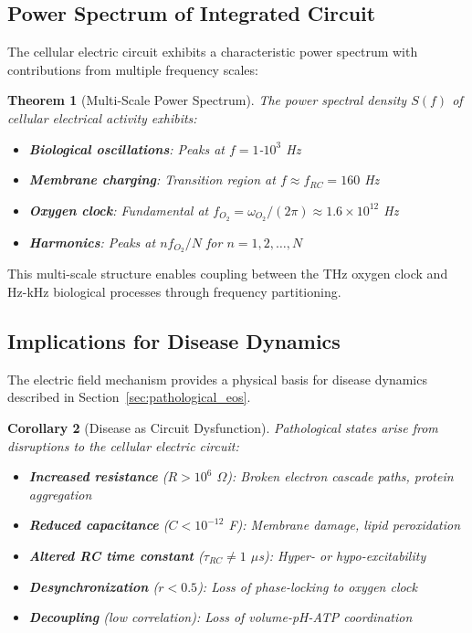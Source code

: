 \documentclass[11pt,twocolumn,a4paper]{article}
\newtheorem{theorem}{Theorem}[section]
\newtheorem{corollary}[theorem]{Corollary}
\theoremstyle{definition}
\theoremstyle{remark}
\begin{document}
\subsection{Power Spectrum of Integrated Circuit}

The cellular electric circuit exhibits a characteristic power spectrum with contributions from multiple frequency scales:

\begin{theorem}[Multi-Scale Power Spectrum]
\label{thm:power_spectrum}
The power spectral density $S(f)$ of cellular electrical activity exhibits:
\begin{itemize}
  \item \textbf{Biological oscillations}: Peaks at $f = 1$-$10^3$ Hz
  \item \textbf{Membrane charging}: Transition region at $f \approx f_{RC} = 160$ Hz
  \item \textbf{Oxygen clock}: Fundamental at $f_{O_2} = \omega_{O_2}/(2\pi) \approx 1.6 \times 10^{12}$ Hz
  \item \textbf{Harmonics}: Peaks at $nf_{O_2}/N$ for $n = 1, 2, \ldots, N$
\end{itemize}
\end{theorem}

This multi-scale structure enables coupling between the THz oxygen clock and Hz-kHz biological processes through frequency partitioning.

\subsection{Implications for Disease Dynamics}

The electric field mechanism provides a physical basis for disease dynamics described in Section~\ref{sec:pathological_eos}.

\begin{corollary}[Disease as Circuit Dysfunction]
\label{cor:disease_circuit}
Pathological states arise from disruptions to the cellular electric circuit:
\begin{itemize}
  \item \textbf{Increased resistance} ($R > 10^6$ $\Omega$): Broken electron cascade paths, protein aggregation
  \item \textbf{Reduced capacitance} ($C < 10^{-12}$ F): Membrane damage, lipid peroxidation
  \item \textbf{Altered RC time constant} ($\tau_{RC} \neq 1$ $\mu$s): Hyper- or hypo-excitability
  \item \textbf{Desynchronization} ($r < 0.5$): Loss of phase-locking to oxygen clock
  \item \textbf{Decoupling} (low correlation): Loss of volume-pH-ATP coordination
\end{itemize}
\end{corollary}
\end{document}

